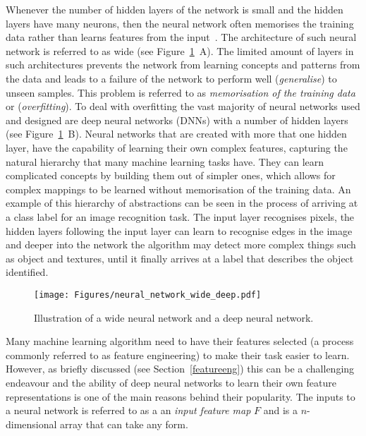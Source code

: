 Whenever the number of hidden layers of the network is small and the hidden layers have many neurons, then the neural network often memorises the training data rather than learns features from the input~\cite{PoggioMRML17}. The architecture of such neural network is referred to as wide (see Figure~\ref{fig:wide}~A). The limited amount of layers in such architectures prevents the network from learning concepts and patterns from the data and leads to a failure of the network to perform well (\textit{generalise}) to unseen samples. This problem is referred to as \textit{memorisation of the training data} or (\textit{overfitting}). To deal with overfitting the vast majority of neural networks used and designed are deep neural networks (DNNs) with a number of hidden layers (see Figure~\ref{fig:wide}~B). Neural networks that are created with more that one hidden layer, have the capability of learning their own complex features, capturing the natural hierarchy that many machine learning tasks have. They can learn complicated concepts by building them out of simpler ones, which allows for complex mappings to be learned without memorisation of the training data. An example of this hierarchy of abstractions can be seen in the process of arriving at a class label for an image recognition task. The input layer recognises pixels, the hidden layers following the input layer can learn to recognise edges in the image and deeper into the network the algorithm may detect more complex things such as object and textures, until it finally arrives at a label that describes the object identified. 


\begin{figure}[ht!]
	\begin{center}
		\texttt{[image: Figures/neural\_network\_wide\_deep.pdf]}
	\end{center}
	\caption{Illustration of a wide neural network and a deep neural network.}
	\label{fig:wide}
\end{figure} 


Many machine learning algorithm need to have their features selected (a process commonly referred to as feature engineering) to make their task easier to learn. However, as briefly discussed (see Section~\ref{featureeng}) this can be a challenging endeavour and the ability of deep neural networks to learn their own feature representations is one of the main reasons behind their popularity. The inputs to a neural network is referred to as a an \textit{input feature map} $F$ and is a $n$-dimensional array that can take any form. 

